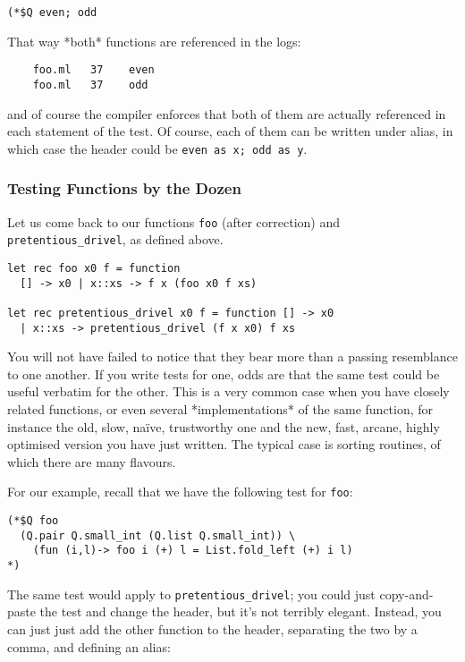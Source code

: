 \documentclass[a4paper,12pt]{article}
\begin{document}
\begin{verbatim}
(*$Q even; odd
\end{verbatim}

That way *both* functions are referenced in the logs:

\begin{verbatim}
    foo.ml   37    even
    foo.ml   37    odd
\end{verbatim}

and of course the compiler enforces that both of them are actually referenced in each
statement of the test. Of course, each of them can be written under alias, in which case
the header could be \texttt{even as x; odd as y}.

\subsubsection{Testing Functions by the Dozen}

Let us come back to our functions \texttt{foo} (after correction) and \texttt{pretentious\_drivel}, as
defined above.


\begin{verbatim}
let rec foo x0 f = function
  [] -> x0 | x::xs -> f x (foo x0 f xs)
  
let rec pretentious_drivel x0 f = function [] -> x0
  | x::xs -> pretentious_drivel (f x x0) f xs
\end{verbatim} 

You will not have failed to notice that they bear more than a passing resemblance to one
another. If you write tests for one, odds are that the same test could be useful verbatim
for the other. This is a very common case when you have closely related functions, or even
several *implementations* of the same function, for instance the old, slow, naïve,
trustworthy one and the new, fast, arcane, highly optimised version you have just written.
The typical case is sorting routines, of which there are many flavours.

For our example, recall that we have the following test for \texttt{foo}:

\begin{verbatim}
(*$Q foo
  (Q.pair Q.small_int (Q.list Q.small_int)) \
    (fun (i,l)-> foo i (+) l = List.fold_left (+) i l)
*)
\end{verbatim}

The same test would apply to \texttt{pretentious\_drivel}; you could just copy-and-paste the test
and change the header, but it's not terribly elegant. Instead, you can just just add the
other function to the header, separating the two by a comma, and defining an alias:
\end{document}
